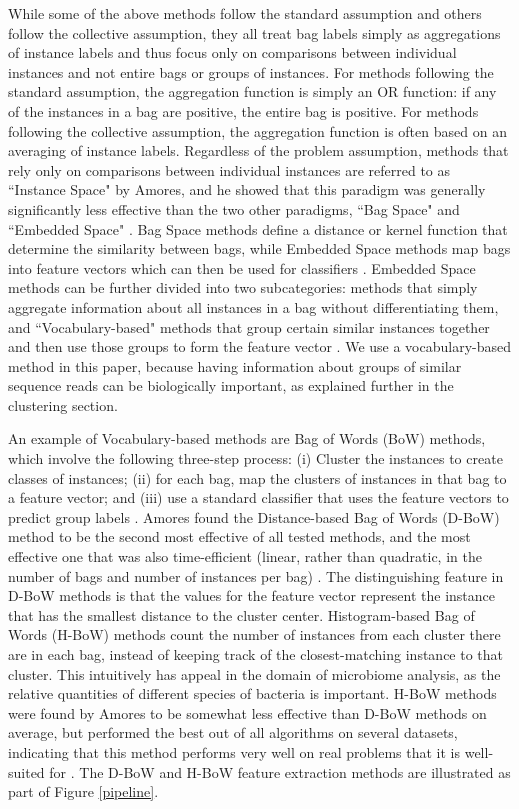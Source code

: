 While some of the above methods follow the standard assumption and others follow the collective assumption, they all treat bag labels simply as aggregations of instance labels and thus focus only on comparisons between individual instances and not entire bags or groups of instances. For methods following the standard assumption, the aggregation function is simply an OR function: if any of the instances in a bag are positive, the entire bag is positive. For methods following the collective assumption, the aggregation function is often based on an averaging of instance labels. Regardless of the problem assumption, methods that rely only on comparisons between individual instances are referred to as ``Instance Space" by Amores, and he showed that this paradigm was generally significantly less effective than the two other paradigms, ``Bag Space" and ``Embedded Space" \cite{amores13}. Bag Space methods define a distance or kernel function that determine the similarity between bags, while Embedded Space methods map bags into feature vectors which can then be used for classifiers \cite{amores13}. Embedded Space methods can be further divided into two subcategories: methods that simply aggregate information about all instances in a bag without differentiating them, and ``Vocabulary-based" methods that group certain similar instances together and then use those groups to form the feature vector \cite{amores13}. We use a vocabulary-based method in this paper, because having information about groups of similar sequence reads can be biologically important, as explained further in the clustering section.

An example of Vocabulary-based methods are Bag of Words (BoW) methods, which involve the following three-step process: (i) Cluster the instances to create classes of instances; (ii) for each bag, map the clusters of instances in that bag to a feature vector; and (iii) use a standard classifier that uses the feature vectors to predict group labels \cite{amores13}. Amores found the Distance-based Bag of Words (D-BoW) method to be the second most effective of all tested methods, and the most effective one that was also time-efficient (linear, rather than quadratic, in the number of bags and number of instances per bag) \cite{amores13}. The distinguishing feature in D-BoW methods is that the values for the feature vector represent the instance that has the smallest distance to the cluster center. Histogram-based Bag of Words (H-BoW) methods count the number of instances from each cluster there are in each bag, instead of keeping track of the closest-matching instance to that cluster. This intuitively has appeal in the domain of microbiome analysis, as the relative quantities of different species of bacteria is important. H-BoW methods were found by Amores to be somewhat less effective than D-BoW methods on average, but performed the best out of all algorithms on several datasets, indicating that this method performs very well on real problems that it is well-suited for \cite{amores13}. The D-BoW and H-BoW feature extraction methods are illustrated as part of Figure \ref{pipeline}.

